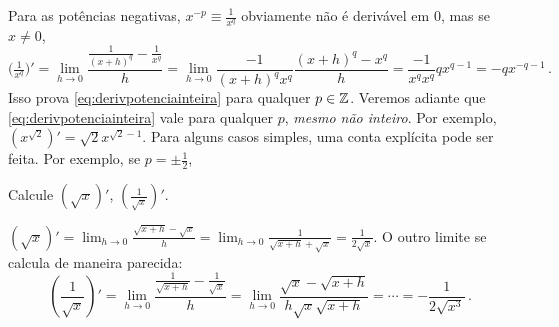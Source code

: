 Para as potências negativas, $x^{-p}\equiv \frac{1}{x^q}$ obviamente não é
derivável em $0$, mas se $x\neq 0$,
$$
\bigl(\tfrac{1}{x^q}\bigr)'=\lim_{h\to
0}\frac{\frac{1}{(x+h)^q}-\frac{1}{x^q}}{h}=
\lim_{h\to
0}\frac{-1}{(x+h)^qx^q}\frac{(x+h)^q-x^q}{h}=
\frac{-1}{x^qx^q}q x^{q-1}=-qx^{-q-1}\,.
$$
Isso prova \eqref{eq:derivpotenciainteira} para qualquer $p\in \mathbb{Z}$.
Veremos adiante que \eqref{eq:derivpotenciainteira} vale para
qualquer $p$, \emph{mesmo não inteiro}. Por exemplo,
$(x^{\sqrt{2}})'=\sqrt{2}x^{\sqrt{2}-1}$. Para alguns casos simples, uma conta
explícita pode ser feita. Por exemplo, se $p=\pm \frac12$,
\begin{exo}
Calcule $(\sqrt{x})'$, $(\frac{1}{\sqrt{x}})'$.
\begin{sol}
$(\sqrt{x})'=\lim_{h\to 0}\frac{\sqrt{x+h}-\sqrt{x}}{h}=
\lim_{h\to 0}\frac{1}{\sqrt{x+h}+\sqrt{x}}=\frac{1}{2\sqrt{x}}$.
O outro limite se calcula de maneira parecida:
$$(\frac{1}{\sqrt{x}})'=\lim_{h\to
0}\frac{\frac{1}{\sqrt{x+h}}-\frac{1}{\sqrt{x}}}{h}=
\lim_{h\to
0}\frac{\sqrt{x}-\sqrt{x+h}}{h\sqrt{x}\sqrt{x+h}}=\cdots=-\frac{1}{2\sqrt{x^3}}
\,.
$$
\end{sol}
\end{exo}




